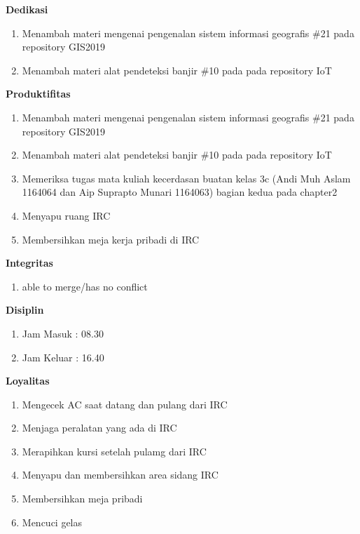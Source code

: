 \begin{enumerate}
\textbf{Dedikasi}
\begin{enumerate}
\item Menambah materi mengenai pengenalan sistem informasi geografis \#21 pada repository GIS2019
\item Menambah materi alat pendeteksi banjir \#10 pada pada repository IoT 
\end{enumerate}

\textbf{Produktifitas}
\begin{enumerate}
\item Menambah materi mengenai pengenalan sistem informasi geografis \#21 pada repository GIS2019
\item Menambah materi alat pendeteksi banjir \#10 pada pada repository IoT 
\item Memeriksa tugas mata kuliah kecerdasan buatan kelas 3c (Andi Muh Aslam 1164064 dan Aip Suprapto Munari 1164063) bagian kedua pada chapter2
\item Menyapu ruang IRC
\item Membersihkan meja kerja pribadi di IRC
\end{enumerate}

\textbf{Integritas}
\begin{enumerate}
\item able to merge/has no conflict
\end{enumerate}


\textbf{Disiplin}
\begin{enumerate}
\item Jam Masuk : 08.30
\item Jam Keluar : 16.40
\end{enumerate}


\textbf{Loyalitas}
\begin{enumerate}
\item Mengecek AC saat datang dan pulang dari IRC
\item Menjaga peralatan yang ada di IRC
\item Merapihkan kursi setelah pulamg dari IRC
\item Menyapu dan membersihkan area sidang IRC
\item Membersihkan meja pribadi
\item Mencuci gelas
\end{enumerate}


\end{enumerate}
